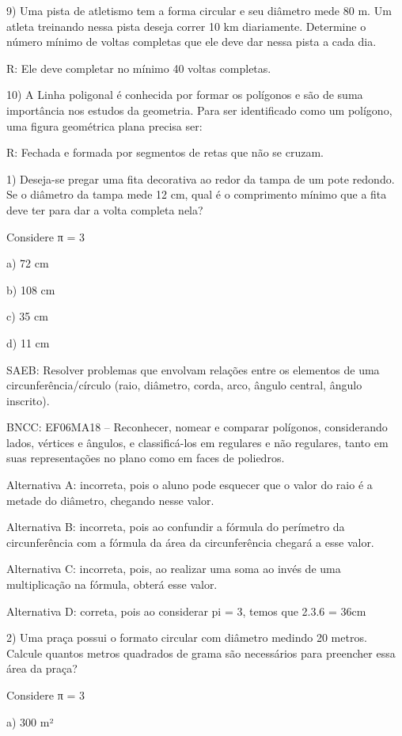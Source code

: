 9) Uma pista de atletismo tem a forma circular e seu diâmetro mede 80 m.
Um atleta treinando nessa pista deseja correr 10 km diariamente.
Determine o número mínimo de voltas completas que ele deve dar nessa
pista a cada dia.

R: Ele deve completar no mínimo 40 voltas completas.

10) A Linha poligonal é conhecida por formar os polígonos e são de suma
importância nos estudos da geometria. Para ser identificado como um
polígono, uma figura geométrica plana precisa ser:

R: Fechada e formada por segmentos de retas que não se cruzam.


1) Deseja-se pregar uma fita decorativa ao redor da tampa de um pote
redondo. Se o diâmetro da tampa mede 12 cm, qual é o comprimento mínimo
que a fita deve ter para dar a volta completa nela?

Considere π = 3

a) 72 cm

b) 108 cm

c) 35 cm

d) 11 cm

SAEB: Resolver problemas que envolvam relações entre os elementos de uma
circunferência/círculo (raio, diâmetro, corda, arco, ângulo central,
ângulo inscrito).

BNCC: EF06MA18 -- Reconhecer, nomear e comparar polígonos, considerando
lados, vértices e ângulos, e classificá-los em regulares e não
regulares, tanto em suas representações no plano como em faces de
poliedros.

Alternativa A: incorreta, pois o aluno pode esquecer que o valor do raio
é a metade do diâmetro, chegando nesse valor.

Alternativa B: incorreta, pois ao confundir a fórmula do perímetro da
circunferência com a fórmula da área da circunferência chegará a esse
valor.

Alternativa C: incorreta, pois, ao realizar uma soma ao invés de uma
multiplicação na fórmula, obterá esse valor.

Alternativa D: correta, pois ao considerar pi = 3, temos que 2.3.6 =
36cm

2) Uma praça possui o formato circular com diâmetro medindo 20 metros.
Calcule quantos metros quadrados de grama são necessários para preencher
essa área da praça?

Considere π = 3

a) 300 m²

